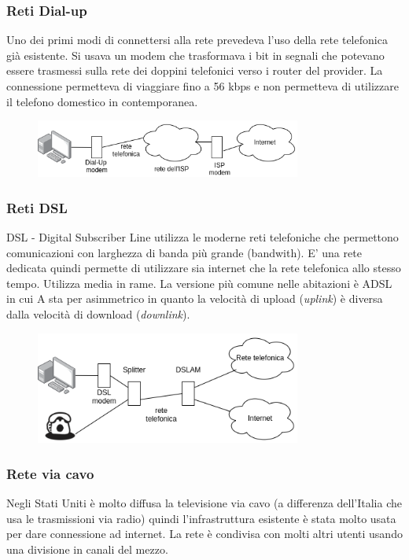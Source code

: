 \subsubsection{Reti Dial-up}
Uno dei primi modi di connettersi alla rete prevedeva l'uso della rete telefonica già esistente. Si usava un modem che trasformava i bit in segnali che potevano essere trasmessi sulla rete dei doppini telefonici verso i router del provider. La connessione permetteva di viaggiare fino a 56 kbps e non permetteva di utilizzare il telefono domestico in contemporanea.

\begin{figure}[H]
    \centering
    \includegraphics[width=330px]{images/1_Introduzione/dial-up.png}
\end{figure}

\subsubsection{Reti DSL}
DSL - Digital Subscriber Line utilizza le moderne reti telefoniche che permettono comunicazioni con larghezza di banda più grande (bandwith). E' una rete dedicata quindi permette di utilizzare sia internet che la rete telefonica allo stesso tempo. Utilizza media in rame. La versione più comune nelle abitazioni è ADSL in cui A sta per asimmetrico in quanto la velocità di upload (\emph{uplink}) è diversa dalla velocità di download (\emph{downlink}).

\begin{figure}[H]
    \centering
    \includegraphics[width=330px]{images/1_Introduzione/DSL.png}
\end{figure}

\subsubsection{Rete via cavo}
Negli Stati Uniti è molto diffusa la televisione via cavo (a differenza dell'Italia che usa le trasmissioni via radio) quindi l'infrastruttura esistente è stata molto usata per dare connessione ad internet. La rete è condivisa con molti altri utenti usando una divisione in canali del mezzo.

